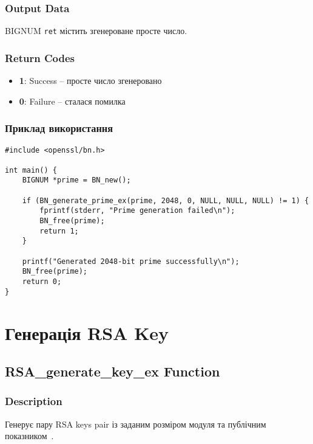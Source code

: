 \subsubsection{Output Data}
BIGNUM \texttt{ret}  містить згенероване просте число.

\subsubsection{Return Codes}
\begin{itemize}
    \item \textbf{1}: Success -- просте число згенеровано
    \item \textbf{0}: Failure -- сталася помилка
\end{itemize}

\subsubsection{Приклад використання}
\begin{verbatim}
#include <openssl/bn.h>

int main() {
    BIGNUM *prime = BN_new();
    
    if (BN_generate_prime_ex(prime, 2048, 0, NULL, NULL, NULL) != 1) {
        fprintf(stderr, "Prime generation failed\n");
        BN_free(prime);
        return 1;
    }
    
    printf("Generated 2048-bit prime successfully\n");
    BN_free(prime);
    return 0;
}
\end{verbatim} 

\section{Генерація RSA Key}

\subsection{RSA\_generate\_key\_ex Function}

\subsubsection{Description}
Генерує пару RSA keys pair із заданим розміром модуля та публічним показником~\cite{rivest1978method, menezes1996handbook}.

\newpage
